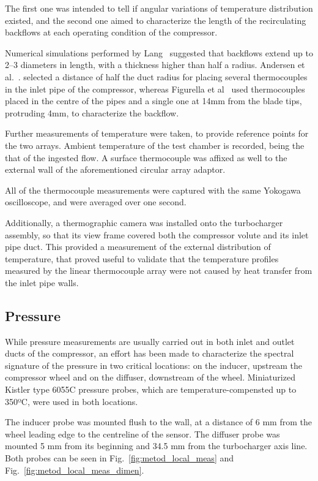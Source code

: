 The first one was intended to tell if angular variations of temperature distribution existed, and the second one aimed to characterize the length of the recirculating backflows at each operating condition of the compressor.

Numerical simulations performed by Lang~\cite{lang2011contribucion} suggested that backflows extend up to 2--3 diameters in length, with a thickness higher than half a radius. Andersen et al.~\cite{andersen2009surge}. selected a distance of half the duct radius for placing several thermocouples in the inlet pipe of the compressor, whereas Figurella et al~\cite{figurella2012noise} used thermocouples placed in the centre of the pipes and a single one at 14mm from the blade tips, protruding 4mm, to characterize the backflow.

Further measurements of temperature were taken, to provide reference points for the two arrays. Ambient temperature of the test chamber is recorded, being the that of the ingested flow. A surface thermocouple was affixed as well to the external wall of the aforementioned circular array adaptor.

All of the thermocouple measurements were captured with the same Yokogawa oscilloscope, and were averaged over one second.

Additionally, a thermographic camera was installed onto the turbocharger assembly, so that its view frame covered both the compressor volute and its inlet pipe duct. This provided a measurement of the external distribution of temperature, that proved useful to validate that the temperature profiles measured by the linear thermocouple array were not caused by heat transfer from the inlet pipe walls.

\subsection{Pressure}

While pressure measurements are usually carried out in both inlet and outlet ducts of the compressor, an effort has been made to characterize the spectral signature of the pressure in two critical locations: on the inducer, upstream the compressor wheel and on the diffuser, downstream of the wheel. Miniaturized Kistler type 6055C pressure probes, which are temperature-compensted up to 350ºC, were used in both locations. 

The inducer probe was mounted flush to the wall, at a distance of 6 mm from the wheel leading edge to the centreline of the sensor. The diffuser probe was mounted 5 mm from its beginning and 34.5 mm from the turbocharger axis line. Both probes can be seen in Fig.~\ref{fig:metod_local_meas} and Fig.~\ref{fig:metod_local_meas_dimen}.

